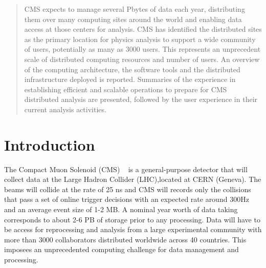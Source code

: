 \date{Received: date / Accepted: date}


\maketitle

\begin{abstract}
CMS expects to manage several Pbytes of data each year, distributing them
over many computing sites around the world and enabling data access at those
centers for analysis. CMS has identified the distributed sites as the primary
location for physics analysis to support a wide community of users,
potentially as many as 3000 users. This represents an unprecedent scale of
distributed computing resources and number of users.
An overview of the computing architecture, the software tools and
the distributed infrastructure deployed is reported.
Summaries of the experience in establishing efficient and scalable operations
to prepare for CMS distributed analysis are presented, followed by
the user experience in their current analysis activities.
\end{abstract}

\section{Introduction}
\label{intro}
The Compact Muon Solenoid (CMS) ~\cite{RefCMS} is a general-purpose detector
that will collect data at the Large Hadron Collider (LHC),located at CERN
(Geneva).
The beams will collide at the rate of 25 ns and CMS will records only the collisions
that pass a set of %
online trigger decisions with an expected rate around 300Hz and an
average event size of 1-2 MB. A nominal year worth of data taking 
corresponds to about 2-6 PB of storage prior to any processing.
Data will have to be access for reprocessing and analysis from a
large experimental community with more than 3000 collaborators distributed
worldwide across 40 countries. This imposees an unprecedented computing
challenge for data management and processing.

